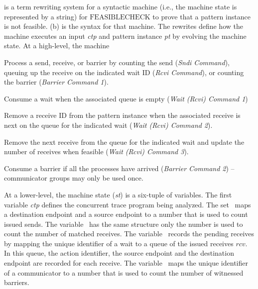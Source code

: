  is a term rewriting system for a syntactic
machine (i.e., the machine state is represented by a string) for
$\mathrm{FEASIBLECHECK}$ to prove that a pattern instance is not
feasible. (b) is the syntax for that machine. The
rewrites define how the machine executes an input \emph{ctp} and
pattern instance \emph{pt} by evolving the machine state. At a high-level, the machine
\begin{compactitem}
\item Process a send, receive, or barrier by counting the send (\emph{Sndi Command}), queuing up the receive on the indicated wait ID (\emph{Rcvi Command}), or counting the barrier (\emph{Barrier Command 1}).
\item Consume a wait when the associated queue is empty (\emph{Wait (Rcvi) Command 1})
\item Remove a receive ID from the pattern instance when the associated receive is next on the queue for the indicated wait (\emph{Wait (Rcvi) Command 2}).
\item Remove the next receive from the queue for the indicated wait and update the number of receives when feasible (\emph{Wait (Rcvi) Command 3}).
\item Consume a barrier if all the processes have arrived (\emph{Barrier Command 2}) -- communicator groups may only be used once.
\end{compactitem}
At a lower-level, the machine state (\textit{st}) is a six-tuple of variables. The first variable \textit{ctp} defines the concurrent trace program being analyzed. The set \epsnd\ maps a destination endpoint and a source endpoint to a number that is used to count issued sends. The variable \eprcv\ has the same structure only the number is used to count the number of matched receives. The variable \epwait\ records the pending receives by mapping the unique identifier of a wait to a queue of the issued receives $\mathit{rcv}$. 
In this queue, the action identifier, the source endpoint and the destination endpoint are recorded for each receive. The variable \epbarrier\ maps the unique identifier of a communicator to a number that is used to count the number of witnessed barriers.

